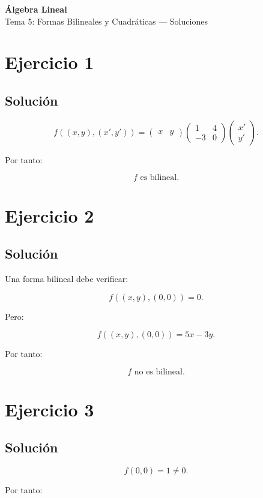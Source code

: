 \documentclass[11pt,a4paper]{article}
\begin{document}
\begin{center}
{\LARGE\bfseries Álgebra Lineal}\\[0.4em]
{\Large Tema 5: Formas Bilineales y Cuadráticas --- Soluciones}
\end{center}

\section{Ejercicio 1}
\subsection{Solución}

\[
f((x,y),(x',y'))
=
\begin{pmatrix}x&y\end{pmatrix}
\begin{pmatrix}
1&4\\
-3&0
\end{pmatrix}
\begin{pmatrix}x'\\y'\end{pmatrix}.
\]

Por tanto:

\[
\boxed{f\text{ es bilineal}.}
\]

\section{Ejercicio 2}
\subsection{Solución}

Una forma bilineal debe verificar:

\[
f((x,y),(0,0))=0.
\]

Pero:

\[
f((x,y),(0,0))=5x-3y.
\]

Por tanto:

\[
\boxed{f\text{ no es bilineal}.}
\]

\section{Ejercicio 3}
\subsection{Solución}

\[
f(0,0)=1\neq0.
\]

Por tanto:
\end{document}

